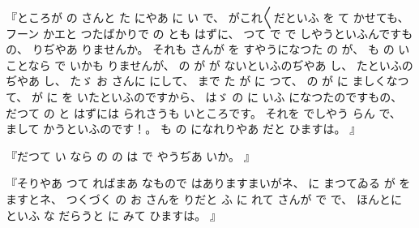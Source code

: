 
%
『ところが
の
さんと
た
にやあ
に
い
で、
%
がこれ〳〵だといふ
を
て
かせても、
%
フーン
かエと
つたばかりで
の
とも
はずに、
%
つて
で
で
しやうといふんですもの、
%
りぢやあ
りませんか。
%
それも
さんが
を
すやうになつた
の
が、
%
も
の
いことなら
で
いかも
りませんが、
%
の
が
が
ないといふのぢやあ
し、
%
たといふのぢやあ
し、
%
たゞ
お
さんに
にして、
%
まで
た
が
に
つて、
%
の
が
に
ましくなつて、
%
が
に
を
いたといふのですから、
%
はゞ
の
に
いふ
になつたのですもの、
%
だつて
の
と
はずには
られさうも
いところです。
%
それを
でしやう
らん
で、
%
まして
かうといふのです！。
%
も
の
になれりやあ
だと
ひますは。
』

%
『だつて
い
なら
の
の
は
で
やうぢあ
いか。
』

%
『そりやあ
つて
ればまあ
なもので
はありますまいがネ、
%
に
まつてゐる
が
を
ますとネ、
%
つくづく
の
お
さんを
りだと
ふ
に
れて
さんが
で%
で、
%
ほんとに%
といふ
な%
だらうと
に
みて
ひますは。
』

